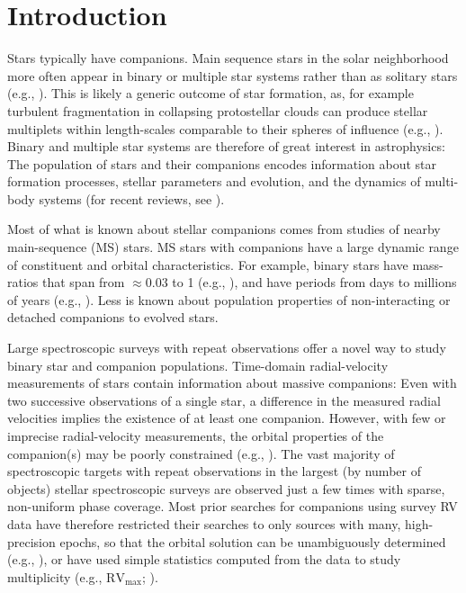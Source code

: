 \documentclass[modern, letterpaper]{aastex62}
\begin{document}

\section{Introduction} \label{sec:intro}

Stars typically have companions.
Main sequence stars in the solar neighborhood more often appear in binary or
multiple star systems rather than as solitary stars (e.g.,
\citealt{Duquennoy:1991,Raghavan:2010,Tokovinin:2014,Moe:2017}).
This is likely a generic outcome of star formation, as, for example turbulent
fragmentation in collapsing protostellar clouds can produce stellar multiplets
within length-scales comparable to their spheres of influence (e.g.,
\citealt{Raskutti:2016}).
Binary and multiple star systems are therefore of great interest in
astrophysics: The population of stars and their companions encodes information
about star formation processes, stellar parameters and evolution, and the
dynamics of multi-body systems (for recent reviews, see
\citealt{Duchene:2013,Moe:2017}).

Most of what is known about stellar companions comes from studies of
nearby main-sequence (MS) stars.
MS stars with companions have a large dynamic range of constituent and orbital
characteristics.
For example, binary stars have mass-ratios that span from $\approx 0.03$
to 1 (e.g., \citealt{Kraus:2008}), and have periods from days to
millions of years (e.g., \citealt{Raghavan:2010}).
Less is known about population properties of non-interacting or detached
companions to evolved stars.

Large spectroscopic surveys with repeat observations offer a novel way to study
binary star and companion populations.
Time-domain radial-velocity measurements of stars contain information about
massive companions: Even with two successive observations of a single star, a
difference in the measured radial velocities implies the existence of at least
one companion.
However, with few or imprecise radial-velocity measurements, the orbital
properties of the companion(s) may be poorly constrained (e.g.,
\citealt{Price-Whelan:2017}).
The vast majority of spectroscopic targets with repeat observations in the
largest (by number of objects) stellar spectroscopic surveys are observed just a
few times with sparse, non-uniform phase coverage.
Most prior searches for companions using survey RV data have therefore
restricted their searches to only sources with many, high-precision epochs, so
that the orbital solution can be unambiguously determined (e.g.,
\citealt{Troup:2016}), or have used simple statistics computed from the data to
study multiplicity (e.g., $\textrm{RV}_\textrm{max}$; \citealt{Badenes:2017}).
\end{document}
